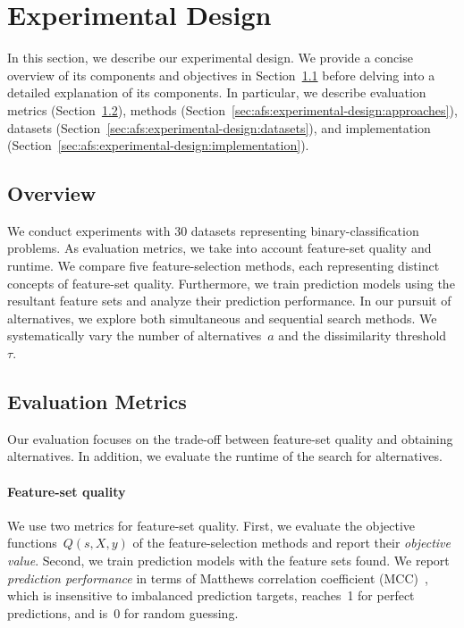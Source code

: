 \documentclass[iicol, sn-basic, Numbered]{sn-jnl} %
\theoremstyle{plain}
\theoremstyle{definition}
\begin{document}
\section{Experimental Design}
\label{sec:afs:experimental-design}

In this section, we describe our experimental design.
We provide a concise overview of its components and objectives in Section~\ref{sec:afs:experimental-design:overview} before delving into a detailed explanation of its components. 
In particular, we describe evaluation metrics (Section~\ref{sec:afs:experimental-design:evaluation}), methods (Section~\ref{sec:afs:experimental-design:approaches}), datasets (Section~\ref{sec:afs:experimental-design:datasets}), and implementation (Section~\ref{sec:afs:experimental-design:implementation}).

\subsection{Overview}
\label{sec:afs:experimental-design:overview}

We conduct experiments with 30 datasets representing binary-classification problems.
As evaluation metrics, we take into account feature-set quality and runtime. 
We compare five feature-selection methods, each representing distinct concepts of feature-set quality. 
Furthermore, we train prediction models using the resultant feature sets and analyze their prediction performance. 
In our pursuit of alternatives, we explore both simultaneous and sequential search methods. 
We systematically vary the number of alternatives~$a$ and the dissimilarity threshold~$\tau$.

\subsection{Evaluation Metrics}
\label{sec:afs:experimental-design:evaluation}

Our evaluation focuses on the trade-off between feature-set quality and obtaining alternatives.
In addition, we evaluate the runtime of the search for alternatives.

\paragraph{Feature-set quality}

We use two metrics for feature-set quality.
First, we evaluate the objective functions~$Q(s,X,y)$ of the feature-selection methods and report their \emph{objective value}.
Second, we train prediction models with the feature sets found.
We report \emph{prediction performance} in terms of Matthews correlation coefficient (MCC)~\cite{matthews1975comparison}, which is insensitive to imbalanced prediction targets, reaches~1 for perfect predictions, and is~0 for random guessing.
\end{document}
